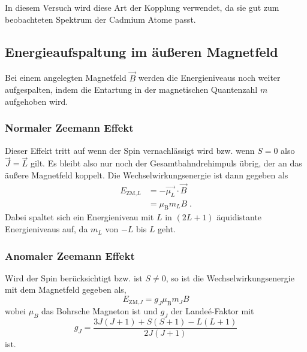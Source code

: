             In diesem Versuch wird diese Art der Kopplung verwendet, da sie gut zum beobachteten Spektrum der Cadmium Atome passt.

    \subsection{Energieaufspaltung im äußeren Magnetfeld}
        Bei einem angelegten Magnetfeld $\vec{B}$ werden die Energieniveaus noch weiter aufgespalten, indem die Entartung in der magnetischen Quantenzahl $m$ aufgehoben wird.
        \subsubsection*{Normaler Zeemann Effekt}
        \label{sec:normalerZeemann}
            Dieser Effekt tritt auf wenn der Spin vernachlässigt wird bzw. wenn $S=0$ also $\vec{J} = \vec{L}$ gilt.
            Es bleibt also nur noch der Gesamtbahndrehimpuls übrig, der an das äußere Magnetfeld koppelt.
            Die Wechselwirkungsenergie ist dann gegeben als
            \begin{align}
                E_{\text{ZM,}L} &= - \vec{\mu_L} \cdot \vec{B} \nonumber \\
                                &= \mu_{\text{B}} m_L B \;.
            \end{align}
            Dabei spaltet sich ein Energieniveau mit $L$ in $(2L+1)$ äquidistante Energieniveaus auf, da $m_L$ von $-L$ bis $L$ geht.

        \subsubsection*{Anomaler Zeemann Effekt}
        \label{sec:anomalerZeemann}
            Wird der Spin berücksichtigt bzw. ist $S \neq 0$, so ist die Wechselwirkungsenergie mit dem Magnetfeld gegeben als,
            \begin{equation}
                E_{\text{ZM,}J} = g_J \mu_{\text{B}} m_J B
                \label{eqn:zeeman_energy}
            \end{equation}
            wobei $\mu_B$ das Bohrsche Magneton ist und $g_J$ der Landeé-Faktor mit
            \begin{equation}
                g_J = \frac{3J(J+1) + S(S+1) - L(L+1)}{2J(J+1)}
                \label{eqn:g_J}
            \end{equation}
            ist.
            
